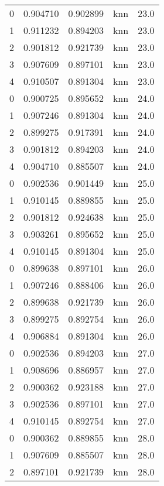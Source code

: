\begin{tabular}{rrrlr}
     0 & 0.904710 & 0.902899 &      knn &       23.0 \\
     1 & 0.911232 & 0.894203 &      knn &       23.0 \\
     2 & 0.901812 & 0.921739 &      knn &       23.0 \\
     3 & 0.907609 & 0.897101 &      knn &       23.0 \\
     4 & 0.910507 & 0.891304 &      knn &       23.0 \\
     0 & 0.900725 & 0.895652 &      knn &       24.0 \\
     1 & 0.907246 & 0.891304 &      knn &       24.0 \\
     2 & 0.899275 & 0.917391 &      knn &       24.0 \\
     3 & 0.901812 & 0.894203 &      knn &       24.0 \\
     4 & 0.904710 & 0.885507 &      knn &       24.0 \\
     0 & 0.902536 & 0.901449 &      knn &       25.0 \\
     1 & 0.910145 & 0.889855 &      knn &       25.0 \\
     2 & 0.901812 & 0.924638 &      knn &       25.0 \\
     3 & 0.903261 & 0.895652 &      knn &       25.0 \\
     4 & 0.910145 & 0.891304 &      knn &       25.0 \\
     0 & 0.899638 & 0.897101 &      knn &       26.0 \\
     1 & 0.907246 & 0.888406 &      knn &       26.0 \\
     2 & 0.899638 & 0.921739 &      knn &       26.0 \\
     3 & 0.899275 & 0.892754 &      knn &       26.0 \\
     4 & 0.906884 & 0.891304 &      knn &       26.0 \\
     0 & 0.902536 & 0.894203 &      knn &       27.0 \\
     1 & 0.908696 & 0.886957 &      knn &       27.0 \\
     2 & 0.900362 & 0.923188 &      knn &       27.0 \\
     3 & 0.902536 & 0.897101 &      knn &       27.0 \\
     4 & 0.910145 & 0.892754 &      knn &       27.0 \\
     0 & 0.900362 & 0.889855 &      knn &       28.0 \\
     1 & 0.907609 & 0.885507 &      knn &       28.0 \\
     2 & 0.897101 & 0.921739 &      knn &       28.0 \\

\end{tabular}
